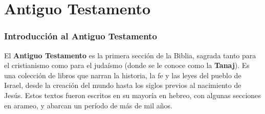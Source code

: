 \documentclass[oneside,  10pt]{book}
\begin{document}
	\tableofcontents
	
	\mainmatter
	
	\part{Antiguo Testamento}

	
\section*{Introducción al Antiguo Testamento}

El \textbf{Antiguo Testamento} es la primera sección de la Biblia, sagrada tanto para el cristianismo como para el judaísmo (donde se le conoce como la \textbf{Tanaj}). Es una colección de libros que narran la historia, la fe y las leyes del pueblo de Israel, desde la creación del mundo hasta los siglos previos al nacimiento de Jesús. Estos textos fueron escritos en su mayoría en hebreo, con algunas secciones en arameo, y abarcan un período de más de mil años.
\end{document}
